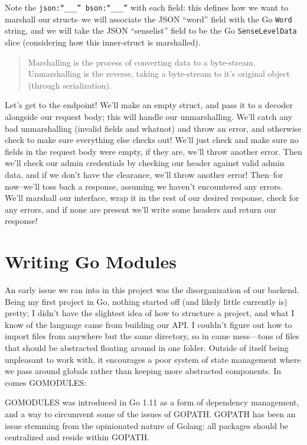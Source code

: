 \documentclass[11pt, twoside, reqno]{book}
\begin{document}
Note the \texttt{json:``\_\_\_'' bson:``\_\_\_''} with each field: this defines how we want to marshall our structs--we will associate the JSON ``word'' field with the Go \texttt{Word} string, and we will take the JSON ``senselist'' field to be the Go \texttt{SenseLevelData} slice (considering how this inner-struct is marshalled).

\begin{quote}
Marshalling is the process of converting data to a byte-stream. Unmarshalling is the reverse, taking a byte-stream to it's original object (through serialization).
\end{quote}

Let's get to the endpoint! We'll make an empty struct, and pass it to a decoder alongside our request body; this will handle our unmarshalling. We'll catch any bad unmarshalling (invalid fields and whatnot) and throw an error, and otherwise check to make sure everything else checks out! We'll just check and make sure no fields in the request body were empty, if they are, we'll throw another error. Then we'll check our admin credentials by checking our header against valid admin data, and if we don't have the clearance, we'll throw another error! Then--for now--we'll toss back a response, assuming we haven't encountered any errors. We'll marshall our interface, wrap it in the rest of our desired response, check for any errors, and if none are present we'll write some headers and return our response!

\section{Writing Go Modules}

An early issue we ran into in this project was the disorganization of our backend. Being my first project in Go, nothing started off (and likely little currently is) pretty; I didn't have the slightest idea of how to structure a project, and what I know of the language came from building our API. I couldn't figure out how to import files from anywhere but the same directory, so in came mess—tons of files that should be abstracted floating around in one folder. Outside of itself being unpleasant to work with, it encourages a poor system of state management where we pass around globals rather than keeping more abstracted components. In comes GOMODULES:

GOMODULES was introduced in Go 1.11 as a form of dependency management, and a way to circumvent some of the issues of GOPATH. GOPATH has been an issue stemming from the opinionated nature of Golang: all packages should be centralized and reside within GOPATH.
\end{document}
